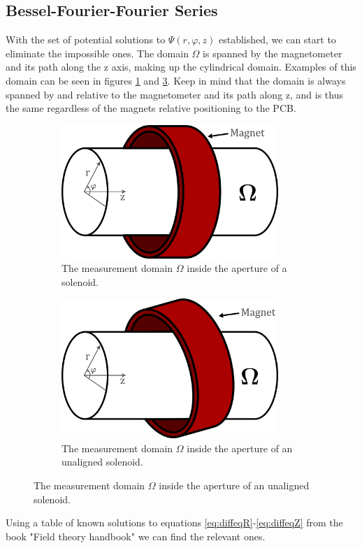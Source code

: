 \subsection{Bessel-Fourier-Fourier Series}
With the set of potential solutions to $\Psi(r,\varphi,z)$ established,
we can start to eliminate the impossible ones. The domain $\Omega$
is spanned by the magnetometer and its path along the z axis, making up
the cylindrical domain. Examples of this domain can be seen in figures
\ref{fig:aligned_domain} and \ref{fig:unaligned_domain}. Keep in mind
that the domain is always spanned by and relative to the magnetometer and
its path along z, and is thus the same regardless of the magnets
relative positioning to the PCB.
\begin{figure}[!h]
    \centering
    \begin{subfigure}[b]{0.45\textwidth}
        \centering
        \includegraphics[width=0.9\textwidth]{figs/aligned_domain.png}
        \caption{The measurement domain $\Omega$
            inside the aperture of a solenoid.}
        \label{fig:aligned_domain}
    \end{subfigure}
    \hfill
    \begin{subfigure}[b]{0.45\textwidth}
        \centering
        \includegraphics[width=0.9\textwidth]{figs/unaligned_domain.png}
        \caption{The measurement domain $\Omega$
            inside the aperture of an unaligned solenoid.}
        \label{fig:unaligned_domain}
    \end{subfigure}
\end{figure}
Using a table of known solutions to equations
\ref{eq:diffeqR}-\ref{eq:diffeqZ} from the book "Field theory handbook"
\cite{moon_field_1988} we can find the relevant ones.

